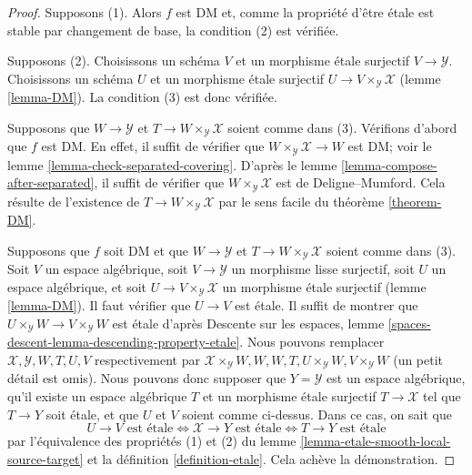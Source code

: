 \begin{proof}
Supposons (1). Alors $f$ est DM et, comme la propri\'et\'e d'\^etre \'etale est stable
par changement de base, la condition (2) est v\'erifi\'ee.

\medskip\noindent
Supposons (2). Choisissons un sch\'ema $V$ et un morphisme \'etale surjectif
$V \to \mathcal{Y}$. Choisissons un sch\'ema $U$ et un morphisme \'etale surjectif
$U \to V \times_\mathcal{Y} \mathcal{X}$ (lemme \ref{lemma-DM}).
La condition (3) est donc v\'erifi\'ee.

\medskip\noindent
Supposons que $W \to \mathcal{Y}$ et $T \to W \times_\mathcal{Y} \mathcal{X}$
soient comme dans (3). V\'erifions d'abord que $f$ est DM. En effet, il suffit de v\'erifier
que $W \times_\mathcal{Y} \mathcal{X} \to W$ est DM; voir
le lemme \ref{lemma-check-separated-covering}.
D'apr\`es le lemme \ref{lemma-compose-after-separated},
il suffit de v\'erifier que $W \times_\mathcal{Y} \mathcal{X}$ est de Deligne--Mumford.
Cela r\'esulte de l'existence de $T \to W \times_\mathcal{Y} \mathcal{X}$
par le sens facile du th\'eor\`eme \ref{theorem-DM}.

\medskip\noindent
Supposons que $f$ soit DM et que $W \to \mathcal{Y}$ et
$T \to W \times_\mathcal{Y} \mathcal{X}$ soient comme dans (3).
Soit $V$ un espace alg\'ebrique, soit $V \to \mathcal{Y}$ un morphisme lisse surjectif,
soit $U$ un espace alg\'ebrique, et soit
$U \to V \times_\mathcal{Y} \mathcal{X}$ un morphisme \'etale surjectif
(lemme \ref{lemma-DM}). Il faut v\'erifier que $U \to V$ est \'etale.
Il suffit de montrer que $U \times_\mathcal{Y} W \to V \times_\mathcal{Y} W$
est \'etale d'apr\`es Descente sur les espaces, lemme
\ref{spaces-descent-lemma-descending-property-etale}.
Nous pouvons remplacer $\mathcal{X}, \mathcal{Y}, W, T, U, V$ respectivement par
$\mathcal{X} \times_\mathcal{Y} W, W, W, T, U \times_\mathcal{Y} W,
V \times_\mathcal{Y} W$ (un petit d\'etail est omis).
Nous pouvons donc supposer que $Y = \mathcal{Y}$ est un espace alg\'ebrique, qu'il existe
un espace alg\'ebrique $T$ et un morphisme \'etale surjectif
$T \to \mathcal{X}$ tel que $T \to Y$ soit \'etale, et que $U$ et $V$
soient comme ci-dessus. Dans ce cas, on sait que
$$
U \to V\text{ est \'etale}
\Leftrightarrow
\mathcal{X} \to Y\text{ est \'etale}
\Leftrightarrow
T \to Y\text{ est \'etale}
$$
par l'\'equivalence des propri\'et\'es (1) et (2) du
lemme \ref{lemma-etale-smooth-local-source-target}
et la d\'efinition \ref{definition-etale}.
Cela ach\`eve la d\'emonstration.
\end{proof}

